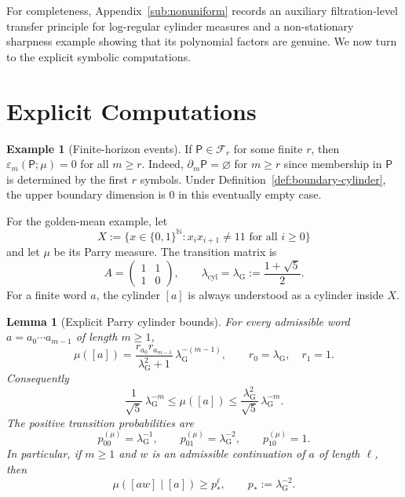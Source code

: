\documentclass{etds}%
\numberwithin{equation}{section}
\theoremstyle{plain}
\newtheorem{lemma}[theorem]{Lemma}
\theoremstyle{definition}
\newtheorem{example}[theorem]{Example}
\theoremstyle{remark}
\newcommand{\NN}{\mathbb{N}}
\begin{document}
For completeness, Appendix~\ref{sub:nonuniform} records an auxiliary
filtration-level transfer principle for log-regular cylinder measures and a
non-stationary sharpness example showing that its polynomial factors are
genuine.  We now turn to the explicit symbolic computations.

\section{Explicit Computations}
\label{sec:examples}

\begin{example}[Finite-horizon events]
\label{ex:finite-horizon-event}
If $\mathsf{P}\in\mathcal{F}_r$ for some finite $r$, then
$\varepsilon_m(\mathsf{P};\mu)=0$ for all $m\ge r$.  Indeed, $\partial_m\mathsf{P}=\varnothing$
for $m\ge r$ since membership in $\mathsf{P}$ is determined by the first $r$
symbols.  Under Definition~\ref{def:boundary-cylinder}, the upper boundary
dimension is $0$ in this eventually empty case.
\end{example}

For the golden-mean example, let
\[
X:=\{x\in\{0,1\}^{\NN}:x_ix_{i+1}\ne 11\text{ for all }i\ge 0\}
\]
and let $\mu$ be its Parry measure.  The transition matrix is
\[
A=\begin{pmatrix}1&1\\1&0\end{pmatrix},
\qquad
\lambda_{\mathrm{cyl}}=\lambda_{\mathrm G}:=\frac{1+\sqrt{5}}{2}.
\]
For a finite word $a$, the cylinder $[a]$ is always understood as a cylinder
inside $X$.

\begin{lemma}[Explicit Parry cylinder bounds]
\label{lem:golden-parry-bounds}
For every admissible word $a=a_0\cdots a_{m-1}$ of length $m\ge 1$,
\[
\mu([a])=\frac{r_{a_0}r_{a_{m-1}}}{\lambda_{\mathrm G}^2+1}\,\lambda_{\mathrm G}^{-(m-1)},
\qquad r_0=\lambda_{\mathrm G},\quad r_1=1.
\]
Consequently
\[
\frac{1}{\sqrt{5}}\,\lambda_{\mathrm G}^{-m}
\le \mu([a])
\le \frac{\lambda_{\mathrm G}^2}{\sqrt{5}}\,\lambda_{\mathrm G}^{-m}.
\]
The positive transition probabilities are
\[
p_{00}^{(\mu)}=\lambda_{\mathrm G}^{-1},\qquad
p_{01}^{(\mu)}=\lambda_{\mathrm G}^{-2},\qquad
p_{10}^{(\mu)}=1.
\]
In particular, if $m\ge 1$ and $w$ is an admissible continuation of $a$ of
length $\ell$, then
\[
\mu([aw]\mid[a])\ge p_*^\ell,\qquad p_*:=\lambda_{\mathrm G}^{-2}.
\]
\end{lemma}
\end{document}
